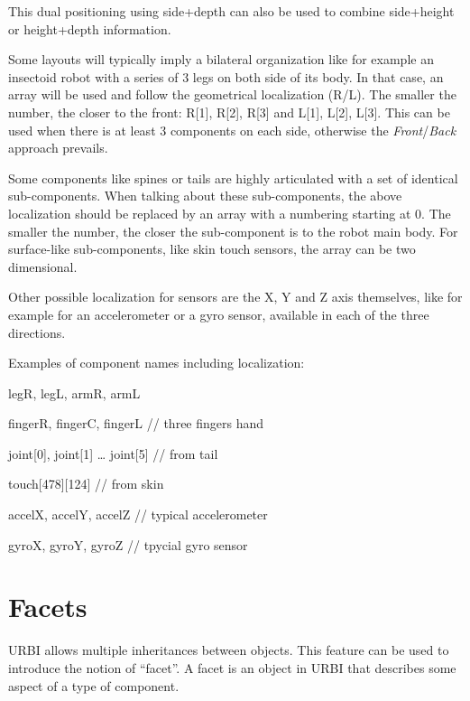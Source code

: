 \documentclass[a4paper]{article}
\begin{document}
{\sffamily
This dual positioning using side+depth can also be used to combine
side+height or height+depth information.}

{\sffamily
Some layouts will typically imply a bilateral organization like for
example an insectoid robot with a series of 3 legs on both side of its
body. In that case, an array will be used and follow the geometrical
localization (R/L). The smaller the number, the closer to the front:
R[1], R[2], R[3] and L[1], L[2], L[3]. This can be used when there is
at least 3 components on each side, otherwise the
\textit{Front}/\textit{Back} approach prevails.}

{\sffamily
Some components like spines or tails are highly articulated with a set
of identical sub-components. When talking about these sub-components,
the above localization should be replaced by an array with a numbering
starting at 0. The smaller the number, the closer the sub-component is
to the robot main body. For surface-like sub-components, like skin
touch sensors, the array can be two dimensional.}

{\sffamily
Other possible localization for sensors are the X, Y and Z axis
themselves, like for example for an accelerometer or a gyro sensor,
available in each of the three directions.}

{\sffamily
Examples of component names including localization:}

{
legR, legL, armR, armL}

{
fingerR, fingerC, fingerL // three fingers hand}

{
joint[0], joint[1] … joint[5] // from tail}

{
touch[478][124] // from skin}

{
accelX, accelY, accelZ // typical accelerometer}

{
gyroX, gyroY, gyroZ // tpycial gyro sensor}

\section[]{ }
\section[Facets]{ Facets}
{\sffamily
URBI allows multiple inheritances between objects. This feature can be
used to introduce the notion of “facet”. A facet is an object in URBI
that describes some aspect of a type of component. }
\end{document}
